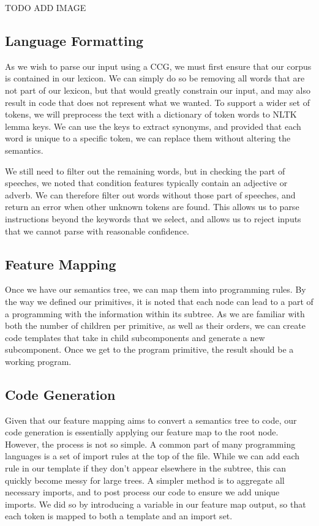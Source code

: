 \documentclass[11pt,letterpaper]{article}
\begin{document}
TODO ADD IMAGE

\subsection{Language Formatting}

As we wish to parse our input using a CCG, we must first ensure that our corpus is contained in our lexicon.
We can simply do so be removing all words that are not part of our lexicon, but that would greatly constrain our input, and may also result in code that does not represent what we wanted.
To support a wider set of tokens, we will preprocess the text with a dictionary of token words to NLTK lemma keys.
We can use the keys to extract synonyms, and provided that each word is unique to a specific token, we can replace them without altering the semantics.

We still need to filter out the remaining words, but in checking the part of speeches, we noted that condition features typically contain an adjective or adverb.
We can therefore filter out words without those part of speeches, and return an error when other unknown tokens are found.
This allows us to parse instructions beyond the keywords that we select, and allows us to reject inputs that we cannot parse with reasonable confidence.

\subsection{Feature Mapping}

Once we have our semantics tree, we can map them into programming rules.
By the way we defined our primitives, it is noted that each node can lead to a part of a programming with the information within its subtree.
As we are familiar with both the number of children per primitive, as well as their orders, we can create code templates that take in child subcomponents and generate a new subcomponent.
Once we get to the program primitive, the result should be a working program.

\subsection{Code Generation}

Given that our feature mapping aims to convert a semantics tree to code, our code generation is essentially applying our feature map to the root node.
However, the process is not so simple.
A common part of many programming languages is a set of import rules at the top of the file.
While we can add each rule in our template if they don't appear elsewhere in the subtree, this can quickly become messy for large trees.
A simpler method is to aggregate all necessary imports, and to post process our code to ensure we add unique imports.
We did so by introducing a variable in our feature map output, so that each token is mapped to both a template and an import set.
\end{document}
